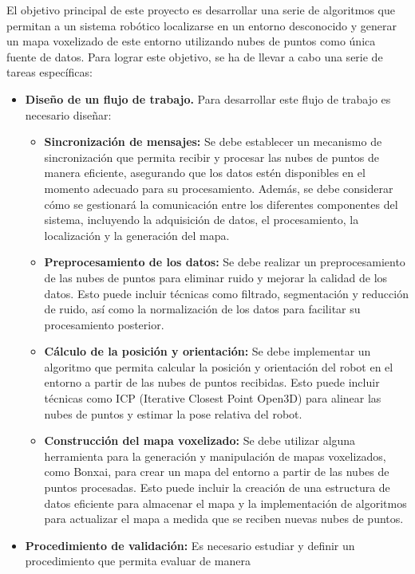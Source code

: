 \documentclass[12pt, a4paper, twoside]{article}
\begin{document}
El objetivo principal de este proyecto es desarrollar una serie de algoritmos que permitan a un sistema robótico localizarse en un 
entorno desconocido y generar un mapa voxelizado de este entorno utilizando nubes de puntos como única fuente de datos. 
Para lograr este objetivo, se ha de llevar a cabo una serie de tareas específicas:
\begin{itemize}
  \item \textbf{Diseño de un flujo de trabajo.} Para desarrollar este flujo de trabajo es necesario diseñar:
   \begin{itemize}
    \item \textbf{Sincronización de mensajes:} Se debe establecer un mecanismo de sincronización que permita 
      recibir y procesar las nubes de puntos de manera eficiente, asegurando que los datos estén disponibles en el momento 
      adecuado para su procesamiento. Además, se debe considerar cómo se gestionará la comunicación entre los diferentes 
      componentes del sistema, incluyendo la adquisición de datos, el procesamiento, la localización y la generación del mapa.
    \item \textbf{Preprocesamiento de los datos:} Se debe realizar un preprocesamiento de las nubes de puntos 
      para eliminar ruido y mejorar la calidad de los datos. Esto puede incluir técnicas como filtrado, segmentación y 
      reducción de ruido, así como la normalización de los datos para facilitar su procesamiento posterior.
    \item \textbf{Cálculo de la posición y orientación:} Se debe implementar un algoritmo que permita calcular la posición y orientación del 
      robot en el entorno a partir de las nubes de puntos recibidas. Esto puede incluir técnicas como ICP (Iterative Closest Point Open3D\cite{Zhou2018}) 
      para alinear las nubes de puntos y estimar la pose relativa del robot.
    \item \textbf{Construcción del mapa voxelizado:} Se debe utilizar alguna herramienta para la generación y manipulación 
      de mapas voxelizados, como Bonxai\cite{faconti2024bonxai}, para crear un mapa del entorno a partir de las nubes de puntos procesadas. 
      Esto puede incluir la creación de una estructura de datos eficiente para almacenar el mapa y la implementación de 
      algoritmos para actualizar el mapa a medida que se reciben nuevas nubes de puntos.
    \end{itemize}
  \item \textbf{Procedimiento de validación:} Es necesario estudiar y definir un procedimiento que permita evaluar de manera 

\end{itemize}
\end{document}
